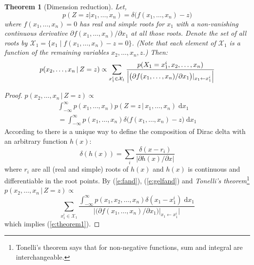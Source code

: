 \documentclass[letterpaper]{article}
\newtheorem{theorem}{Theorem}
\newcommand{\pr}{p}
\newcommand{\dd}{\;\mathrm{d}} %
\begin{document}
\begin{theorem}[Dimension reduction] 
\label{theorem1}
Let, 
\[ 
\pr(Z\!=\!z | x_1, \ldots, x_n) = \delta \big( f(x_1, \ldots, x_n)-z \big)
\]
where $f(x_1, \ldots, x_n) = 0$ has real and simple roots for $x_1$ with a non-vanishing continuous derivative
$\partial f(x_1, \ldots, x_n) / \partial x_1$ at all those roots.
Denote the set of all roots by 
 $ \mathcal{X}_1 = \{ x_1 \; | \; f(x_1, \ldots, x_n) - z = 0 \} $. 
(Note that each element of $ \mathcal{X}_1 $
 is a function of the remaining variables $ x_2,\dots,x_n,z $.)
 Then:
\begin{equation}\footnotesize
\label{e:theorem1}
p(x_2, \ldots, x_n \,|\, Z=z) \propto 
\sum_{x_1^i \in \mathcal{X}_1} 
\frac{p(X_1=x_1^i, x_2, \ldots, x_n)}
{\Big|\big(\partial f(x_1, \ldots, x_n) / \partial x_1 \big)|_{x_1 \leftarrow x_1^i} \Big|}
\end{equation}
\end{theorem}
\begin{proof} 
{\footnotesize
$p(x_2, \ldots, x_n \,|\, Z=z) \propto$
\begin{multline}
\int_{-\infty}^{\infty}p(x_1, \ldots, x_n)p(Z=z \,|\, x_1, \ldots, x_n) \dd x_1 %
%
\\=\int_{-\infty}^{\infty}p(x_1, \ldots, x_n)
\delta \big( f(x_1, \ldots, x_n) - z \big) \dd x_1 
\label{e:fand}
\end{multline}
}
According to \cite{gel1964generalized}
there is a unique way to define the composition of Dirac delta with 
an arbitrary function $h(x)$:
\begin{equation}
\label{e:gelfand}
\delta(h(x)) = \sum_{i} \frac{\delta(x - r_i)}{|\partial h(x)/\partial x|}
\end{equation}
where $r_i$ are all (real and simple) roots of $h(x)$ and $h(x)$ is continuous and differentiable in the root points. By (\ref{e:fand}), (\ref{e:gelfand})  and 
\emph{Tonelli's theorem}\footnote{Tonelli's theorem says that for non-negative functions, sum and integral are interchangeable.} 
$\pr(x_2, \ldots, x_n \,|\, Z = z) \propto$
\begin{equation*}%
\sum_{x_1^i \in \mathcal{X}_1} 
\frac{\int_{-\infty}^{\infty} p(x_1, x_2, \ldots, x_n)  \delta(x_1 - x_1^i) \dd x_1}
{\Big|\big(\partial f(x_1, \ldots, x_n) / \partial x_1 \big)|_{x_1 \leftarrow x_1^i} \Big|}
\end{equation*}
which implies (\ref{e:theorem1}).
\end{proof}
%
\end{document}
